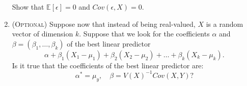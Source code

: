 \documentclass[11pt]{article} %
\begin{document}
\begin{prproblem}
\begin{enumerate}
Show that $\mathbb{E}[\epsilon]=0$ and $Cov(\epsilon,X) = 0$. 


\item ({\scshape Optional}) Suppose now that instead of being real-valued, $X$ is a random vector of dimension $k$. Suppose that we look for the coefficients $\alpha$ and $\beta = (\beta_1, \ldots, \beta_k)$ of the best linear predictor
\[ \alpha + \beta_1 ( X_1 -\mu_{1} ) + \beta_2 (X_2- \mu_2) + \ldots + \beta_{k} (X_k - \mu_k). \]
Is it true that the coefficients of the best linear predictor are:
\[ \alpha^* = \mu_y, \quad \beta = V(X)^{-1} Cov(X,Y) ? \]
\end{enumerate}
\end{prproblem}


\noindent 



%
%
%
%
%
%
%
%
\end{document}
